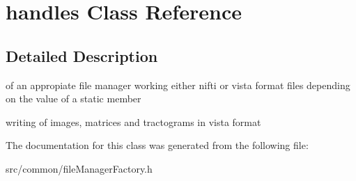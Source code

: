 \hypertarget{classhandles}{\section{handles \-Class \-Reference}
\label{classhandles}
}


\subsection{\-Detailed \-Description}
of an appropiate file manager working either nifti or vista format files depending on the value of a static member

writing of images, matrices and tractograms in vista format 

\-The documentation for this class was generated from the following file\-:\begin{DoxyCompactItemize}
\item 
src/common/file\-Manager\-Factory.\-h\end{DoxyCompactItemize}
